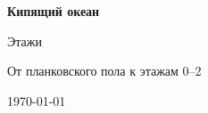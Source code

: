 \begin{titlepage}
  \centering
  \vspace*{2cm}
  {\LARGE\bfseries Кипящий океан\par}
  \vspace{0.8cm}
  {\Large Этажи\par}
  \vspace{1.2cm}
  {\large От планковского пола к этажам 0--2\par}
  \vfill
  {\large \today\par}
\end{titlepage}
\clearpage

\clearpage
\tableofcontents
\clearpage
